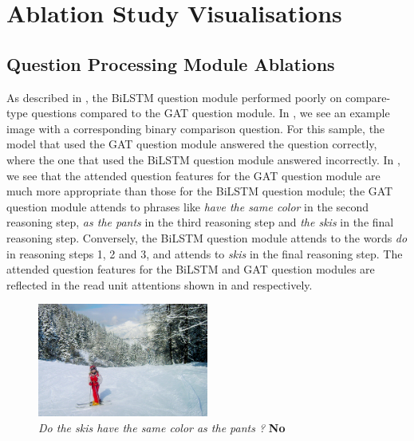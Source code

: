 \chapter{Ablation Study Visualisations}
\label{appendix:ablation_study_visualisations}

\section{Question Processing Module Ablations}
\label{section:question_processing_module_ablation_visualisations}

As described in \subsectionautorefname{ \ref{subsec:question_module_ablations}}, the BiLSTM question module performed poorly on compare-type questions compared to the GAT question module. In \figureautorefname{ \ref{fig:question_ablation_sample}}, we see an example image with a corresponding binary comparison question. For this sample, the model that used the GAT question module answered the question correctly, where the one that used the BiLSTM question module answered incorrectly. In \figureautorefname{ \ref{fig:bilstm_gat_control_attention_maps}}, we see that the attended question features for the GAT question module are much more appropriate than those for the BiLSTM question module; the GAT question module attends to phrases like \textit{have the same color} in the second reasoning step, \textit{as the pants} in the third reasoning step and \textit{the skis} in the final reasoning step. Conversely, the BiLSTM question module attends to the words \textit{do} in reasoning steps 1, 2 and 3, and attends to \textit{skis} in the final reasoning step. The attended question features for the BiLSTM and GAT question modules are reflected in the read unit attentions shown in \figureautorefname{ \ref{fig:bilstm_read_attention_maps}} and \figureautorefname{ \ref{fig:gat_read_attention_maps}} respectively.

\begin{figure}[htbp]
    \centering
    \includegraphics[width=0.5\textwidth]{figures/qav/skipants.png}
    \caption[A sample compare-typ question and its correponding image.]{\textit{Do the skis have the same color as the pants ?} \textbf{No}}
    \label{fig:question_ablation_sample}
\end{figure}

